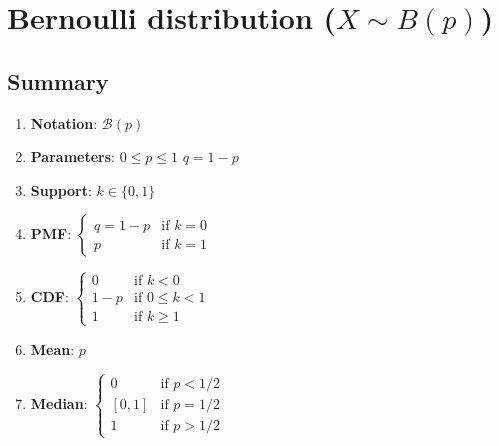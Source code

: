 \section{Bernoulli distribution ($X \sim B(p)$)}

\subsection{Summary}

\begin{enumerate}
    \item \textbf{Notation}:
    $
        \mathcal{B}(p)
    $
    \hfill \cite{wiki/Bernoulli_distribution}

    \item \textbf{Parameters}:
    $  {\displaystyle 0\leq p\leq 1}$
    \hspace{1cm}
    $ {\displaystyle q=1-p} $
    \hfill \cite{wiki/Bernoulli_distribution}

    \item \textbf{Support}:
    $
         {\displaystyle k\in \{0,1\}}
    $
    \hfill \cite{wiki/Bernoulli_distribution}

    \item \textbf{PMF}:
    $
         {\displaystyle {\begin{cases}q=1-p&{\text{if }}k=0\\p&{\text{if }}k=1\end{cases}}}
    $
    \hfill \cite{wiki/Bernoulli_distribution}

    \item \textbf{CDF}:
    $
         {\displaystyle {\begin{cases}0&{\text{if }}k<0\\1-p&{\text{if }}0\leq k<1\\1&{\text{if }}k\geq 1\end{cases}}}
    $
    \hfill \cite{wiki/Bernoulli_distribution}

    \item \textbf{Mean}:
    $
        p
    $
    \hfill \cite{wiki/Bernoulli_distribution}

    \item \textbf{Median}:
    $
         {\displaystyle {\begin{cases}0&{\text{if }}p<1/2\\\left[0,1\right]&{\text{if }}p=1/2\\1&{\text{if }}p>1/2\end{cases}}}
    $
    \hfill \cite{wiki/Bernoulli_distribution}


\end{enumerate}
